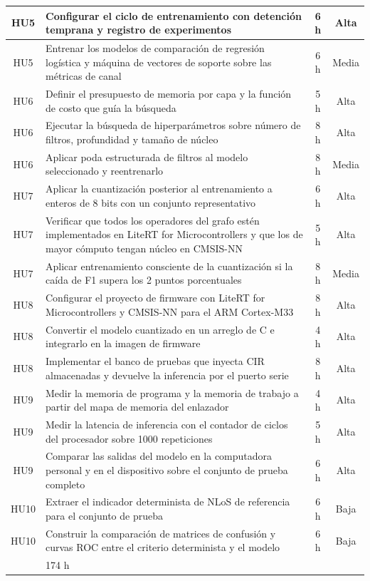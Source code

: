 \documentclass[
11pt, %
]{charter}
\begin{document}
\begin{longtable}{@{}|c|p{8.0cm}|c|c|@{}}
HU5 & Configurar el ciclo de entrenamiento con detención temprana y registro de experimentos & 6 h & Alta \\ \hline
HU5 & Entrenar los modelos de comparación de regresión logística y máquina de vectores de soporte sobre las métricas de canal & 6 h & Media \\ \hline
HU6 & Definir el presupuesto de memoria por capa y la función de costo que guía la búsqueda & 5 h & Alta \\ \hline
HU6 & Ejecutar la búsqueda de hiperparámetros sobre número de filtros, profundidad y tamaño de núcleo & 8 h & Alta \\ \hline
HU6 & Aplicar poda estructurada de filtros al modelo seleccionado y reentrenarlo & 8 h & Media \\ \hline
HU7 & Aplicar la cuantización posterior al entrenamiento a enteros de 8 bits con un conjunto representativo & 6 h & Alta \\ \hline
HU7 & Verificar que todos los operadores del grafo estén implementados en LiteRT for Microcontrollers y que los de mayor cómputo tengan núcleo en CMSIS-NN & 5 h & Alta \\ \hline
HU7 & Aplicar entrenamiento consciente de la cuantización si la caída de F1 supera los 2 puntos porcentuales & 8 h & Media \\ \hline
HU8 & Configurar el proyecto de firmware con LiteRT for Microcontrollers y CMSIS-NN para el ARM Cortex-M33 & 8 h & Alta \\ \hline
HU8 & Convertir el modelo cuantizado en un arreglo de C e integrarlo en la imagen de firmware & 4 h & Alta \\ \hline
HU8 & Implementar el banco de pruebas que inyecta CIR almacenadas y devuelve la inferencia por el puerto serie & 8 h & Alta \\ \hline
HU9 & Medir la memoria de programa y la memoria de trabajo a partir del mapa de memoria del enlazador & 4 h & Alta \\ \hline
HU9 & Medir la latencia de inferencia con el contador de ciclos del procesador sobre 1000 repeticiones & 5 h & Alta \\ \hline
HU9 & Comparar las salidas del modelo en la computadora personal y en el dispositivo sobre el conjunto de prueba completo & 6 h & Alta \\ \hline
HU10 & Extraer el indicador determinista de NLoS de referencia para el conjunto de prueba & 6 h & Baja \\ \hline
HU10 & Construir la comparación de matrices de confusión y curvas ROC entre el criterio determinista y el modelo & 6 h & Baja \\ \hline
\rowcolor[HTML]{EFEFEF}
\multicolumn{2}{|r|}{Total} & 174 h & \\ \hline
\end{longtable}
\else\fi
\end{document}
